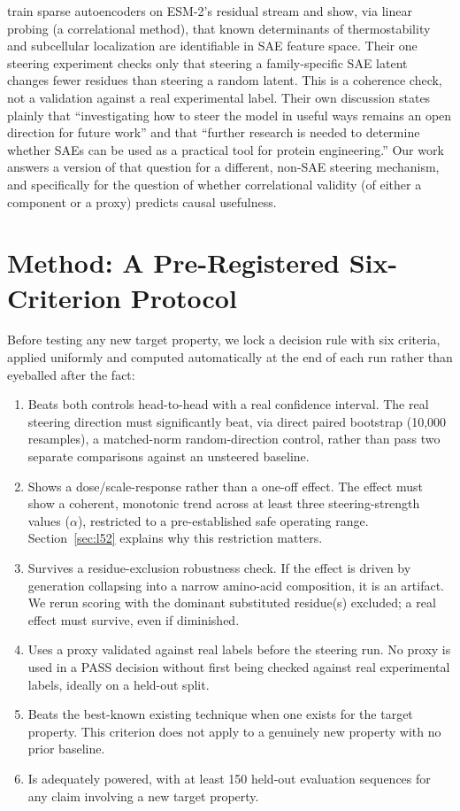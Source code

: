 \documentclass{article}
\begin{document}
\citet{adams2025mechanistic} train sparse autoencoders on ESM-2's
residual stream and show, via linear probing (a correlational method),
that known determinants of thermostability and subcellular localization
are identifiable in SAE feature space. Their one steering experiment
checks only that steering a family-specific SAE latent changes fewer
residues than steering a random latent. This is a coherence check, not a
validation against a real experimental label. Their own discussion
states plainly that ``investigating how to steer the model in useful
ways remains an open direction for future work'' and that ``further
research is needed to determine whether SAEs can be used as a practical
tool for protein engineering.'' Our work answers a version of that
question for a different, non-SAE steering mechanism, and specifically
for the question of whether correlational validity (of either a
component or a proxy) predicts causal usefulness.

\section{Method: A Pre-Registered Six-Criterion Protocol}
\label{sec:method}

Before testing any new target property, we lock a decision rule with six
criteria, applied uniformly and computed automatically at the end of
each run rather than eyeballed after the fact:

\begin{enumerate}
\item Beats both controls head-to-head with a real confidence interval.
  The real steering direction must significantly beat, via
  direct paired bootstrap (10{,}000 resamples), a matched-norm
  random-direction control, rather than pass two separate comparisons against an
  unsteered baseline.
\item Shows a dose/scale-response rather than a one-off effect. The effect must show
  a coherent, monotonic trend across at least three steering-strength
  values ($\alpha$), restricted to a pre-established safe operating
  range. Section~\ref{sec:l52} explains why this restriction matters.
\item Survives a residue-exclusion robustness check. If the
  effect is driven by generation collapsing into a narrow amino-acid
  composition, it is an artifact. We rerun scoring with the dominant
  substituted residue(s) excluded; a real effect must survive, even if
  diminished.
\item Uses a proxy validated against real labels before the steering run.
  No proxy is used in a PASS decision without first
  being checked against real experimental labels, ideally on a held-out
  split.
\item Beats the best-known existing technique when one exists for the
  target property. This criterion does not apply to a genuinely new
  property with no prior baseline.
\item Is adequately powered, with at least 150 held-out evaluation
  sequences for any claim involving a new target property.
\end{enumerate}
\end{document}

